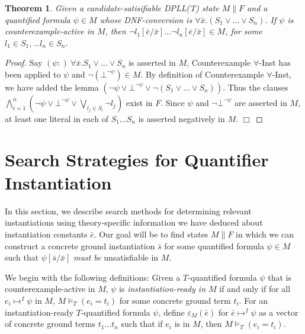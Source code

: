 \documentclass{llncs}
\newtheorem{thm}{Theorem}
\begin{document}
\begin{thm}
\label{thm:cerep}
Given a candidate-satisifiable DPLL(T) state $M \parallel F$ and a quantified formula $\psi \in M$ whose DNF-conversion is $\forall \bar{x}. (S_1 \vee \ldots \vee S_n)$.
If $\psi$ is counterexample-active in $M$, then $\neg l_1 [\bar{e}/\bar{x}] \ldots \neg l_n [\bar{e}/\bar{x}] \in M$, for some $l_1 \in S_1, \ldots l_n \in S_n$.
\end{thm}
\begin{proof}
Say $(\psi :) \ \forall \bar{x}. S_1 \vee \ldots \vee S_n$ is asserted in $M$, Counterexample $\forall$-Inst has been applied to $\psi$ and $\neg (\bot^{\neg \psi}) \in M$.
By definition of Counterexample $\forall$-Inst, we have added the lemma $( \neg \psi \vee \bot^{\neg \psi} \vee \neg (S_1 \vee \ldots \vee S_n ) )$.
Thus the clauses $\displaystyle\bigwedge\limits_{i=1}^n ( \neg \psi \vee \bot^{\neg \psi} \vee \displaystyle\bigvee\limits_{l_j \in S_i} \neg l_j)$ exist in $F$.
Since $\psi$ and $\neg \bot^{\neg \psi}$ are asserted in $M$, at least one literal in each of $S_1 \ldots S_n$ is asserted negatively in $M$. $\Box$
\end{proof}

\section{Search Strategies for Quantifier Instantiation}

In this section, we describe search methods for determining relevant instantiations using theory-specific information we have deduced about instantiation constants $\bar{e}$.
Our goal will be to find states $M \parallel F$ in which we can construct a concrete ground instantiation $\bar{s}$ for some quantified formula $\psi \in M$ such that $\psi [\bar{s}/\bar{x}]$ \emph{must be} unsatisfiable in $M$.

We begin with the following definitions:
Given a $T$-quantified formula $\psi$ that is counterexample-active in $M$, $\psi$ is \emph{instantiation-ready in $M$} if and only if for all $e_i \mapsto^I \psi$ in $M$, $M \models_T (e_i = t_i)$ for some concrete ground term $t_i$.
For an instantiation-ready $T$-quantified formula $\psi$, define $\varepsilon_M( \bar{e} )$ for $\bar{e} \mapsto^I \psi$ as a vector of concrete ground terms $t_1 \ldots t_n$ such that if $e_i$ is in $M$, then $M \models_T (e_i = t_i)$.
\end{document}
